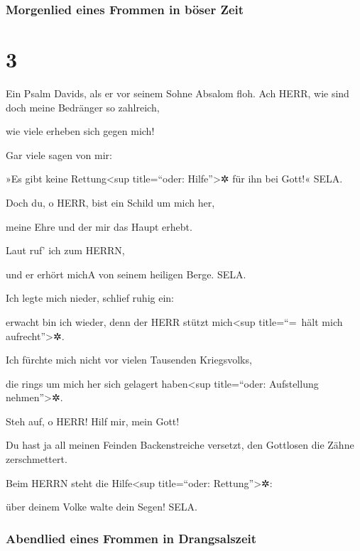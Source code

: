 \hypertarget{morgenlied-eines-frommen-in-buxf6ser-zeit}{%
\subsubsection{Morgenlied eines Frommen in böser
Zeit}\label{morgenlied-eines-frommen-in-buxf6ser-zeit}}

\hypertarget{section-2}{%
\section{3}\label{section-2}}

Ein Psalm Davids, als er vor seinem Sohne Absalom floh.
Ach HERR, wie sind doch meine Bedränger so zahlreich,

wie viele erheben sich gegen mich!

Gar viele sagen von mir:

»Es gibt keine Rettung\textless sup title=``oder: Hilfe''\textgreater✲
für ihn bei Gott!« SELA.

Doch du, o HERR, bist ein Schild um mich her,

meine Ehre und der mir das Haupt erhebt.

Laut ruf' ich zum HERRN,

und er erhört mich{A} von seinem heiligen Berge. SELA.

Ich legte mich nieder, schlief ruhig ein:

erwacht bin ich wieder, denn der HERR stützt mich\textless sup
title=``=~hält mich aufrecht''\textgreater✲.

Ich fürchte mich nicht vor vielen Tausenden Kriegsvolks,

die rings um mich her sich gelagert haben\textless sup title=``oder:
Aufstellung nehmen''\textgreater✲.

Steh auf, o HERR! Hilf mir, mein Gott!

Du hast ja all meinen Feinden Backenstreiche versetzt, den Gottlosen die
Zähne zerschmettert.

Beim HERRN steht die Hilfe\textless sup title=``oder:
Rettung''\textgreater✲:

über deinem Volke walte dein Segen! SELA.

\hypertarget{abendlied-eines-frommen-in-drangsalszeit}{%
\subsubsection{Abendlied eines Frommen in
Drangsalszeit}\label{abendlied-eines-frommen-in-drangsalszeit}}

